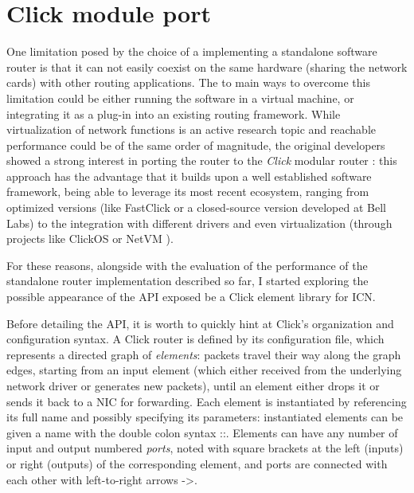 \documentclass[11pt,a4paper,twoside,titlepage,openany]{book}
\newcommand{\mono}[1]{{\footnotesize \ttfamily #1}}
\begin{document}
\section{Click module port}\label{sec:augustus.click}


One limitation posed by the choice of a implementing a standalone software router is that it can not easily coexist on the same hardware (sharing the network cards) with other routing applications. The to main ways to overcome this limitation could be either running the software in a virtual machine, or integrating it as a plug-in into an existing routing framework. While virtualization of network functions is an active research topic and reachable performance could be of the same order of magnitude, the original developers showed a strong interest in porting the router to the \emph{Click} modular router \cite{click}: this approach has the advantage that it builds upon a well established software framework, being able to leverage its most recent ecosystem, ranging from optimized versions (like FastClick \cite{fastclick} or a closed-source version developed at Bell Labs) to the integration with different drivers and even virtualization (through projects like ClickOS \cite{clickos} or NetVM \cite{netvm}).

For these reasons, alongside with the evaluation of the performance of the standalone router implementation described so far, I started exploring the possible appearance of the API exposed be a Click element library for ICN.

Before detailing the API, it is worth to quickly hint at Click's organization and configuration syntax. A Click router is defined by its configuration file, which represents a directed graph of \emph{elements}: packets travel their way along the graph edges, starting from an input element (which either received from the underlying network driver or generates new packets), until an element either drops it or sends it back to a NIC for forwarding. Each element is instantiated by referencing its full name and possibly specifying its parameters: instantiated elements can be given a name with the double colon syntax \mono{::}. Elements can have any number of input and output numbered \emph{ports}, noted with square brackets at the left (inputs) or right (outputs) of the corresponding element, and ports are connected with each other with left-to-right arrows \mono{->}.
\end{document}
